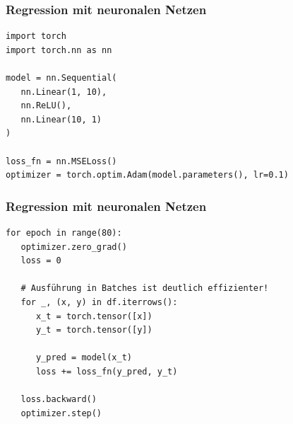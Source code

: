 
\begin{frame}[fragile]
\frametitle{Regression mit neuronalen Netzen}

\begin{verbatim}
import torch
import torch.nn as nn

model = nn.Sequential(
   nn.Linear(1, 10),
   nn.ReLU(),
   nn.Linear(10, 1)
)

loss_fn = nn.MSELoss()
optimizer = torch.optim.Adam(model.parameters(), lr=0.1)
\end{verbatim}

\end{frame}


\begin{frame}[fragile]
\frametitle{Regression mit neuronalen Netzen}

\begin{verbatim}
for epoch in range(80):
   optimizer.zero_grad()
   loss = 0

   # Ausführung in Batches ist deutlich effizienter!
   for _, (x, y) in df.iterrows():
      x_t = torch.tensor([x])
      y_t = torch.tensor([y])

      y_pred = model(x_t)
      loss += loss_fn(y_pred, y_t)

   loss.backward()
   optimizer.step()
\end{verbatim}

\end{frame}


